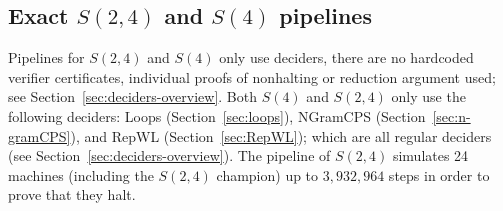 \documentclass[a4paper,british]{article}
\theoremstyle{definition} %
\numberwithin{equation}{section}
\theoremstyle{definition} %
\begin{document}
\subsection{Exact $S(2,4)$ and $S(4)$ pipelines}

Pipelines for $S(2,4)$ and $S(4)$ only use deciders, \ie there are no hardcoded verifier certificates, individual proofs of nonhalting or reduction argument used; see Section~\ref{sec:deciders-overview}. Both $S(4)$ and $S(2,4)$ only use the following deciders: Loops (Section~\ref{sec:loops}), NGramCPS (Section~\ref{sec:n-gramCPS}), and RepWL (Section~\ref{sec:RepWL}); which are all regular deciders (see Section~\ref{sec:deciders-overview}). The pipeline of $S(2,4)$ simulates 24 machines (including the $S(2,4)$ champion) up to $3{,}932{,}964$ steps in order to prove that they halt.
\end{document}
